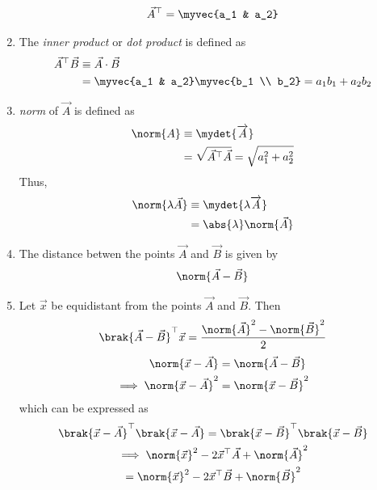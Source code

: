 \begin{enumerate}[label=\thesection.\arabic*.,ref=\thesection.\theenumi]
\begin{align}
  \label{eq:transpose2d}
  \vec{A}^{\top}  = \myvec{a_1 & a_2}
\end{align}
%
\item The {\em inner product} or {\em dot product} is defined as
  \label{prop:dot2d}
\begin{align}
  \label{eq:dot2d}
  \vec{A}^{\top} \vec{B} &\equiv \vec{A} \cdot \vec{B} 
  \\
  &= \myvec{a_1 & a_2} \myvec{b_1 \\ b_2}= a_1b_1+a_2b_2 
\end{align}
%
\item {\em norm} of $\vec{A}$ is defined as
\begin{align}
  \label{eq:norm2d}
  \norm{A} &\equiv \mydet{\overrightarrow{A}}
  \\
  &= \sqrt{\vec{A}^{\top} \vec{A}}= \sqrt{a_1^2+a_2^2}
\end{align}
Thus, 
\begin{align}
  \label{eq:norm2d_const}
  \norm{\lambda \vec{A}} &\equiv \mydet{\lambda\overrightarrow{A}}
  \\
  &= \abs{\lambda} \norm{\vec{A}}
\end{align}
\item The distance betwen the points $\vec{A}$ and $\vec{B}$ is given by 
\begin{align}
  \label{eq:norm2d_dist}
\norm{\vec{A}-\vec{B}} 
\end{align}
\item Let $\vec{x}$ be equidistant from the points $\vec{A}$ and $\vec{B}$.  Then 
  \begin{align}
	  \brak{\vec{A}-\vec{B}}^{\top}{\vec{x}} 
	  =  \frac{\norm{\vec{A}}^2 - \norm{\vec{B}}^2}{2}
  \label{eq:norm2d_equidist}
  \end{align}
  \solution 
\begin{align}
	\norm{\vec{x}-\vec{A}} &=
\norm{\vec{A}-\vec{B}} 
\\
	\implies \norm{\vec{x}-\vec{A}}^2 &=
\norm{\vec{x}-\vec{B}}^2 
\end{align}
which can be expressed as 
\begin{multline}
	\brak{\vec{x}-\vec{A}}^{\top} \brak{\vec{x}-\vec{A}}=
	\brak{\vec{x}-\vec{B}}^{\top} 
\brak{\vec{x}-\vec{B}}
\\
	\implies	\norm{\vec{x}}^2-2{\vec{x}}^{\top}\vec{A} + \norm{\vec{A}}^2
	\\= \norm{\vec{x}}^2-2{\vec{x}}^{\top}\vec{B} + \norm{\vec{B}}^2
\end{multline}

\end{enumerate}

